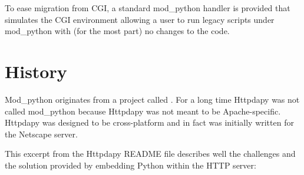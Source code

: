 To ease migration from CGI, a standard mod_python handler is provided
that simulates the CGI environment allowing a user to run legacy scripts
under mod_python with (for the most part) no changes to the code.
 
\begin{seealso}
\end{seealso}

\section{History\label{intr-history}}

Mod_python originates from a project called
. For
a long time Httpdapy was not called mod_python because Httpdapy was
not meant to be Apache-specific. Httpdapy was designed to be
cross-platform and in fact was initially written for the Netscape
server.

This excerpt from the Httpdapy README file describes well the
challenges and the solution provided by embedding Python within the
HTTP server:

